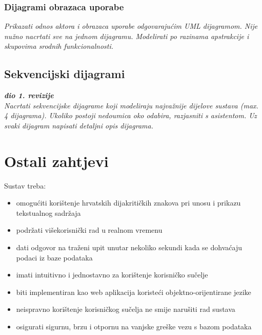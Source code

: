 					
				\subsubsection{Dijagrami obrazaca uporabe}
					
					\textit{Prikazati odnos aktora i obrazaca uporabe odgovarajućim UML dijagramom. Nije nužno nacrtati sve na jednom dijagramu. Modelirati po razinama apstrakcije i skupovima srodnih funkcionalnosti.}
				\eject		
				
			\subsection{Sekvencijski dijagrami}
				
				\textbf{\textit{dio 1. revizije}}\\
				
				\textit{Nacrtati sekvencijske dijagrame koji modeliraju najvažnije dijelove sustava (max. 4 dijagrama). Ukoliko postoji nedoumica oko odabira, razjasniti s asistentom. Uz svaki dijagram napisati detaljni opis dijagrama.}
				\eject
	
		\section{Ostali zahtjevi}
		 	
		 	\noindent Sustav treba:
			 \begin{itemize}
			 	\item omogućiti korištenje hrvatskih dijakritičkih znakova pri unosu i prikazu tekstualnog sadržaja
			 	\item podržati višekorisnički rad u realnom vremenu
			 	\item dati odgovor na traženi upit unutar nekoliko sekundi kada se dohvaćaju podaci iz baze podataka
			 	\item imati intuitivno i jednostavno za korištenje korisničko sučelje
			 	\item biti implementiran kao web aplikacija koristeći objektno-orijentirane jezike
			 	\item neispravno korištenje korisničkog sučelja ne smije narušiti rad sustava
			 	\item osigurati sigurnu, brzu i otpornu na vanjske greške vezu s bazom podataka
			 \end{itemize}
			 
			 
			 
	